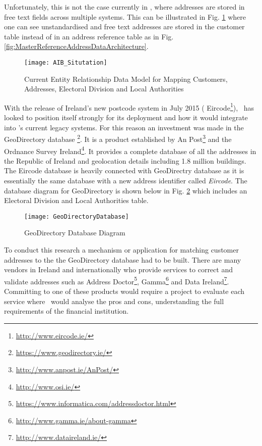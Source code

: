 Unfortunately, this is not the case currently in \subjectname, where addresses are stored in free text fields across multiple systems. This can be illustrated in Fig. \ref{fig:AIB_Situtation} where one can see unstandardised and free text addresses are stored in the customer table instead of in an address reference table as in Fig. \ref{fig:MasterReferenceAddressDataArchitecture}.

\begin{figure}[H]
	\texttt{[image: AIB\_Situtation]}
	\caption{Current Entity Relationship Data Model for Mapping Customers, Addresses, Electoral Division and Local Authorities}
	\label{fig:AIB_Situtation}
\end{figure}

With the release of Ireland's new postcode system in July 2015 ( Eircode\footnote{\url{http://www.eircode.ie/}}), \subjectname\ has looked to position itself strongly for its deployment and how it would integrate into \subjectname's current legacy systems. For this reason an investment was made in the GeoDirectory database \footnote{\url{https://www.geodirectory.ie/}}. It is a product established by An Post\footnote{\url{http://www.anpost.ie/AnPost/}} and the Ordnance Survey Ireland\footnote{\url{http://www.osi.ie/}}. It provides a complete database of all the addresses in the Republic of Ireland and geolocation details including 1.8 million buildings. The Eircode database is heavily connected with GeoDirectry database as it is essentially the same database with a new address identifier called \textit{Eircode}. The database diagram for GeoDirectory is shown below in Fig. \ref{fig:GeoDirectoryDatabase} which includes an Electoral Division and Local Authorities table.

\begin{figure}[H]
	\texttt{[image: GeoDirectoryDatabase]}
	\caption{GeoDirectory Database Diagram}
	\label{fig:GeoDirectoryDatabase}
\end{figure}

To conduct this research a mechanism or application for matching customer addresses to the the GeoDirectory database had to be built. There are many vendors in Ireland and internationally who provide services to correct and validate addresses such as Address Doctor\footnote{\url{https://www.informatica.com/addressdoctor.html}}, Gamma\footnote{\url{http://www.gamma.ie/about-gamma}} and Data Ireland\footnote{\url{http://www.dataireland.ie/}}. Committing to one of these products would require a project to evaluate each service where \subjectname\ would analyse the pros and cons, understanding the full requirements of the financial institution.

